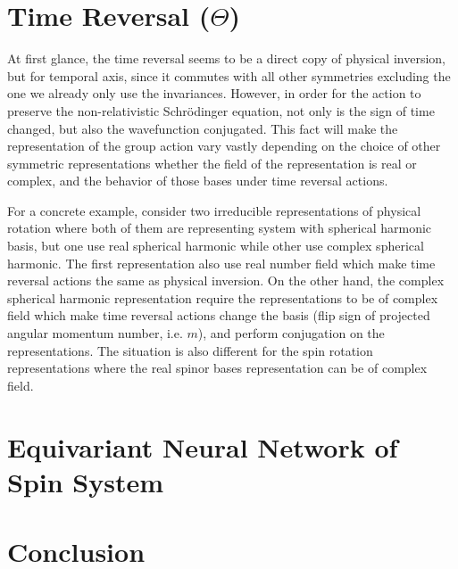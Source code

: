 \documentclass[reprint, 10pt]{revtex4-2}
\begin{document}
\section{Time Reversal ($\Theta$)}
At first glance, the time reversal seems to be a direct copy of physical inversion, but for temporal axis, since it commutes
with all other symmetries excluding the one we already only use the invariances. However, in order for the action to preserve 
the non-relativistic Schr\"odinger equation, not only is the sign of time changed, but also the wavefunction conjugated. 
This fact will make the representation of the group action vary vastly depending on the choice of other symmetric 
representations whether the field of the representation is real or complex, and the behavior
of those bases under time reversal actions. 

For a concrete example, consider two irreducible representations of physical
rotation where both of them are representing system with spherical harmonic basis, but one use real spherical harmonic
while other use complex spherical harmonic. The first representation also use real number field which make time reversal
actions the same as physical inversion. On the other hand, the complex spherical harmonic representation require the 
representations to be of complex field which make time reversal actions change the basis (flip sign of projected angular 
momentum number, i.e. $m$), and perform conjugation on the representations. The situation is also different for the spin
rotation representations where the real spinor bases representation can be of complex field.



\section{Equivariant Neural Network of Spin System}


\section{Conclusion}
\end{document}
